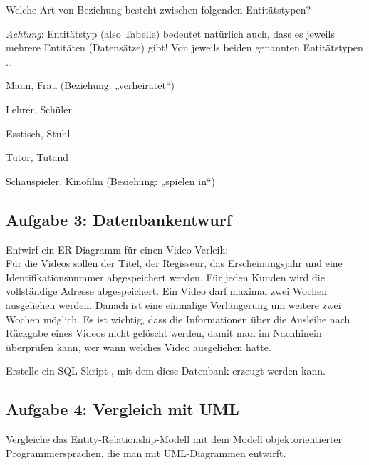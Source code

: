 Welche Art von Beziehung besteht zwischen folgenden Entitätstypen? 

\emph{Achtung}: Entitätstyp (also Tabelle) bedeutet natürlich auch, dass es
jeweils mehrere Entitäten (Datensätze) gibt! Von jeweils beiden genannten Entitätstypen
\ldots

\begin{compactenum}[a)]
\item Mann, Frau (Beziehung: „verheiratet“)
\item Lehrer, Schüler
\item Esstisch, Stuhl
\item Tutor, Tutand
\item Schauspieler, Kinofilm (Beziehung: „spielen in“)
\end{compactenum}


\subsection{Aufgabe 3: Datenbankentwurf}

\begin{compactenum}[a)] 
\item Entwirf ein ER-Diagramm für einen Video-Verleih:\\
Für die Videos sollen der Titel, der Regisseur, das Erscheinungsjahr und eine
Identifikationsnummer abgespeichert werden. Für jeden Kunden wird die
vollständige Adresse abgespeichert. Ein Video darf maximal zwei Wochen
ausgeliehen werden. Danach ist eine einmalige Verlängerung um weitere zwei
Wochen möglich. Es ist wichtig, dass die Informationen über die Ausleihe nach
Rückgabe eines Videos nicht gelöscht werden, damit man im Nachhinein überprüfen
kann, wer wann welches Video ausgeliehen hatte.
\item Erstelle ein SQL-Skript , mit dem diese
Datenbank erzeugt werden kann.
\end{compactenum}

\pagebreak
 
\subsection{Aufgabe 4: Vergleich mit UML}

Vergleiche das Entity-Relationship-Modell mit dem Modell objektorientierter
Programmiersprachen, die man mit UML-Diagrammen entwirft.


